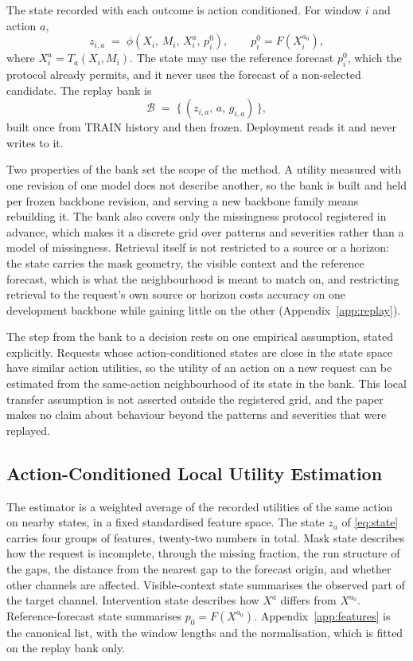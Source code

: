 \documentclass{article}
\newcommand{\calB}{\mathcal{B}}
\begin{document}
The state recorded with each outcome is action conditioned. For window $i$ and action $a$,
\begin{equation}
  z_{i,a} \;=\; \phi\!\left(X_i,\, M_i,\, X_i^{a},\, p_i^{0}\right),
  \qquad
  p_i^{0} = F(X_i^{a_0}),
  \label{eq:state}
\end{equation}
where $X_i^{a} = T_a(X_i, M_i)$. The state may use the reference forecast $p_i^0$, which the
protocol already permits, and it never uses the forecast of a non-selected candidate. The
replay bank is
\begin{equation}
  \calB \;=\; \bigl\{\, (z_{i,a},\, a,\, g_{i,a}) \,\bigr\},
  \label{eq:replay-bank}
\end{equation}
built once from TRAIN history and then frozen. Deployment reads it and never writes to it.

Two properties of the bank set the scope of the method. A utility measured with one revision
of one model does not describe another, so the bank is built and held per frozen backbone
revision, and serving a new backbone family means rebuilding it. The bank also covers only the
missingness protocol registered in advance, which makes it a discrete grid over patterns and
severities rather than a model of missingness. Retrieval itself is not restricted to a source
or a horizon: the state carries the mask geometry, the visible context and the reference
forecast, which is what the neighbourhood is meant to match on, and restricting retrieval to
the request's own source or horizon costs accuracy on one development backbone while gaining
little on the other (Appendix~\ref{app:replay}).

The step from the bank to a decision rests on one empirical assumption, stated explicitly.
Requests whose action-conditioned states are close in the state space have similar action
utilities, so the utility of an action on a new request can be estimated from the same-action
neighbourhood of its state in the bank. This local transfer assumption is not asserted outside
the registered grid, and the paper makes no claim about behaviour beyond the patterns and
severities that were replayed.

\subsection{Action-Conditioned Local Utility Estimation}
\label{sec:method-scoring}
The estimator is a weighted average of the recorded utilities of the same action on nearby
states, in a fixed standardised feature space. The state $z_a$ of \eqref{eq:state} carries
four groups of features, twenty-two numbers in total. Mask state describes how the request is
incomplete, through the missing fraction, the run structure of the gaps, the distance from the
nearest gap to the forecast origin, and whether other channels are affected. Visible-context
state summarises the observed part of the target channel. Intervention state describes how
$X^{a}$ differs from $X^{a_0}$. Reference-forecast state summarises $p_0 = F(X^{a_0})$.
Appendix~\ref{app:features} is the canonical list, with the window lengths and the
normalisation, which is fitted on the replay bank only.
\end{document}
